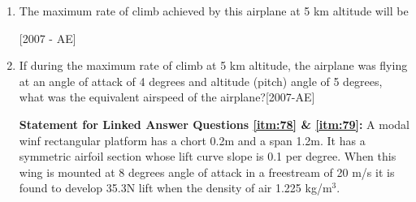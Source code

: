 \documentclass[journal]{IEEEtran}
\begin{document}
\begin{enumerate}
\begin{wrapfigure}
    \centering
    
\end{wrapfigure}
    \item The maximum rate of climb achieved by this airplane at 5 km altitude will be\label{itm:76}\\\strut\hfill{[2007 - AE]}
        \begin{enumerate}
        \end{enumerate}
    \item If during the maximum rate of climb at 5 km altitude, the airplane was flying at an angle of attack of 4 degrees and altitude (pitch) angle of 5 degrees, what was the equivalent airspeed of the airplane?\label{itm:77}\hfill{[2007-AE]}
        \begin{enumerate}
        \end{enumerate}

\textbf{Statement for Linked Answer Questions \ref{itm:78} \& \ref{itm:79}:} A modal winf rectangular platform has a chort 0.2m and a span 1.2m. It has a symmetric airfoil section whose lift curve slope is 0.1 per degree. When this wing is mounted at 8 degrees angle of attack in a freestream of 20 m/s it is found to develop 35.3N lift when the density of air 1.225 kg/m$^3$.


\end{enumerate}
\end{document}
